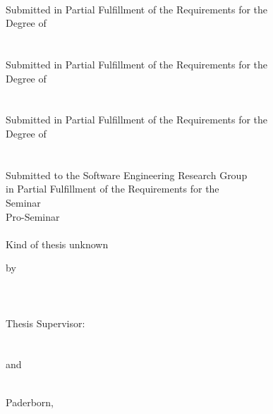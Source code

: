 \begin{titlepage}
\begin{center}
    
  \ifthenelse{\equal{\ausarbeitungsTyp}{\ausarbeitungsTypMaster}}
	{
		{\Large \masterArbeit }\\[6pt]
		Submitted in Partial Fulfillment of the Requirements for the\\
		Degree of\\[6pt]
  	{\Large \gradMaster}\\[30pt]
	}
	{
	 	\ifthenelse{\equal{\ausarbeitungsTyp}{\ausarbeitungsTypDiplom}}
		{
			{\Large \diplomArbeit }\\[6pt]
	  	Submitted in Partial Fulfillment of the Requirements for the\\
		  Degree of\\[6pt]
	  	{\Large \gradDiplom}\\[30pt]
		}
		{
		 	\ifthenelse{\equal{\ausarbeitungsTyp}{\ausarbeitungsTypBachelor}}
			{
				{\Large \bachelorArbeit }\\[6pt]
		  	Submitted in Partial Fulfillment of the Requirements for the\\
		    Degree of\\[6pt]
		  	{\Large \gradBachelor}\\[30pt]
			}
			{
			 	\ifthenelse{\equal{\ausarbeitungsTyp}{\ausarbeitungsTypSeminar}
			 							\OR
			 							\equal{\ausarbeitungsTyp}{\ausarbeitungsTypProSeminar}
			 						 }
				{
					{\Large \seminarArbeit }\\[6pt]
			  	Submitted to the Software Engineering Research Group\\
			  	in Partial Fulfillment of the Requirements for the\\
			  	\ifthenelse{\equal{\ausarbeitungsTyp}{\ausarbeitungsTypSeminar}}
			  	{
			  		Seminar\\[6pt]
			  	}
			  	{
			  		Pro-Seminar\\[6pt]
			  	}
			  	{\Large \titelDesSeminars}\\[10pt]
				}
				{
				 	{\Large Kind of thesis unknown }\\[42pt]
				}
			}
		}
	}  
  
  
  by\\
  {\scshape\large \meinName}\\
  \meineStrasseHausNr\\\meinePLZundOrt\\[30pt]
  
  Thesis Supervisor:\\
  
\ifthenelse{\equal{\ausarbeitungsTyp}{\ausarbeitungsTypSeminar}\OR{\equal{\ausarbeitungsTyp}{\ausarbeitungsTypProSeminar}}}
{
	{\large \meinErstgutachter}\\[30pt]
}
{
 	{\large \meinErstgutachter}\\
  and\\
  {\large \meinZweitgutachter}\\[30pt]
}
  
  {Paderborn, \meinErstellungsdatum}
\end{center}
\end{titlepage}
